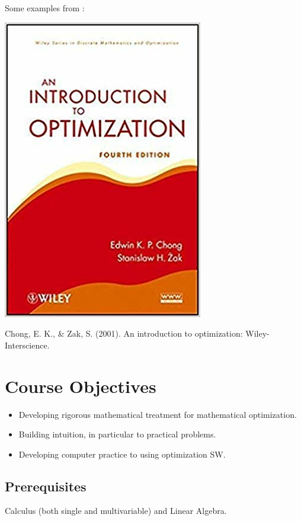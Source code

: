 \begin{minipage}[t]{0.3\linewidth}
  Some examples from \cite{Chong2001AnIntorductionToOptimization}:

  \bigskip

  \hfil\includegraphics[height=0.5\textheight]{../Graphics/FrontCover2.png}\hfil

  Chong, E. K., \& Zak, S. (2001). An introduction to optimization: Wiley-Interscience.
\end{minipage}

\clearpage
\chapter*{Course Objectives}

\begin{itemize}
  \item Developing rigorous mathematical treatment for mathematical optimization.

  \item Building intuition, in particular to practical problems.

  \item Developing computer practice to using optimization SW.

\end{itemize}


\section*{Prerequisites}\label{cha:prerequisites}

Calculus (both single and multivariable) and Linear Algebra.

\clearpage
{
  \tiny
  \tableofcontents
}


